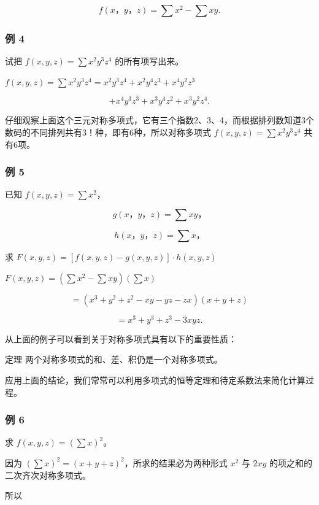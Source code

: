 \[
f (x\text{，} y\text{，} z) = \sum x ^ {2} - \sum x y.
\]

\subsubsection{例 4}

试把 \(f(x, y, z) = \sum x^2 y^3 z^4\) 的所有项写出来。

\(f(x, y, z) = \sum x^2 y^3 z^4 = x^2 y^3 z^4 + x^2 y^4 z^3 + x^4 y^2 z^3\)

\[
+ x ^ {4} y ^ {3} z ^ {3} + x ^ {3} y ^ {4} z ^ {2} + x ^ {3} y ^ {2} z ^ {4}.
\]

仔细观察上面这个三元对称多项式，它有三个指数2、3、4，而根据排列数知道3个数码的不同排列共有3！种，即有6种，所以对称多项式
\(f(x,y,z)=\sum x^{2}y^{3}z^{4}\) 共有6项。

\subsubsection{例 5}

已知 \(f(x, y, z) = \sum x^2\)，

\[
g (x\text{，} y\text{，} z) = \sum x y\text{，}
\]

\[
h (x\text{，} y\text{，} z) = \sum x\text{，}
\]

求 \(F(x, y, z) = [f(x, y, z) - g(x, y, z)] \cdot h(x, y, z)\)

 \(F(x,y,z) = (\sum x^{2} - \sum xy)(\sum x)\)

\[
= \left(x ^ {3} + y ^ {2} + z ^ {2} - x y - y z - z x\right) (x + y + z)
\]

\[
= x ^ {3} + y ^ {3} + z ^ {3} - 3 x y z.
\]

从上面的例子可以看到关于对称多项式具有以下的重要性质：

定理 两个对称多项式的和、差、积仍是一个对称多项式。

应用上面的结论，我们常常可以利用多项式的恒等定理和待定系数法来简化计算过程。

\subsubsection{例 6}

求 \(f(x, y, z) = (\sum x)^2\)。

 因为
\((\sum x)^2 = (x + y + z)^2\)，所求的结果必为两种形式 \(x^2\) 与
\(2xy\) 的项之和的二次齐次对称多项式。

所以

